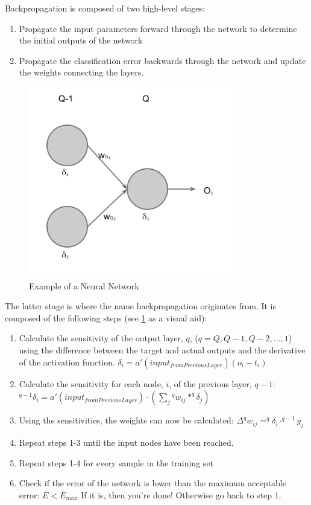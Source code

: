 \documentclass{report}
\begin{document}
Backpropagation is composed of two high-level stages:

\begin{enumerate}
\item Propagate the input parameters forward through the network to determine the initial outputs of the network
\item Propagate the classification error backwards through the network and update the weights connecting the layers.
\end{enumerate}

\begin{figure}[ht!]
  \label{neuralNet}
  \centering
  \includegraphics[width=90mm]{neuralNet}
  \caption{Example of a Neural Network}
\end{figure}

The latter stage is where the name backpropagation originates from. It is composed of the following steps (see \ref{neuralNet} as a visual aid):
\begin{enumerate}
\item Calculate the sensitivity of the output layer, $q$, ($q = Q, Q-1, Q-2,...,1$) using the difference between the target and actual outputs and the derivative of the activation function. $\delta_i = \mathit{a'}(\mathit{input_{fromPreviousLayer}})(o_i - t_i)$
\item Calculate the sensitivity for each node, $i$, of the previous layer, $q-1$: $^{q-1}\delta_i =  \mathit{a'}(\mathit{input_{fromPreviousLayer}}) \cdot  (\sum\limits_{j} {^{q}w_{ij}* ^{q}\delta_j})$
\item Using the sensitivities, the weights can now be calculated: $\Delta^{q}w_{ij} = ^{q}\delta_i \cdot ^{q-1}y_j$
\item Repeat steps 1-3 until the input nodes have been reached.
\item Repeat steps 1-4 for every sample in the training set
\item Check if the error of the network is lower than the maximum acceptable error: $E < E_{max}$ If it is, then you're done! Otherwise go back to step 1.
\end{enumerate}
\end{document}
